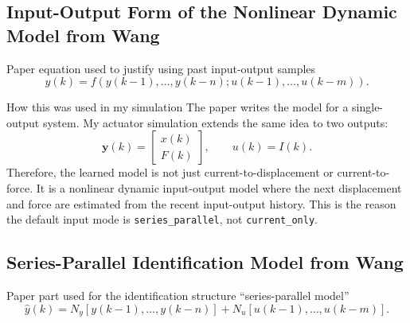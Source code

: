 \documentclass[11pt]{article}
\newcommand{\vect}[1]{\mathbf{#1}}
\begin{document}
\subsection{Input-Output Form of the Nonlinear Dynamic Model from Wang}
\begin{paperbox}{Paper equation used to justify using past input-output samples \cite{wang2017}}
\begin{equation}
 y(k)=f\left(y(k-1),\ldots,y(k-n);u(k-1),\ldots,u(k-m)\right).
\end{equation}
\end{paperbox}

\begin{implementationbox}{How this was used in my simulation}
The paper writes the model for a single-output system. My actuator simulation extends the same idea to two outputs:
\begin{equation}
\vect{y}(k)=\begin{bmatrix}x(k)\\F(k)\end{bmatrix},
\qquad u(k)=I(k).
\end{equation}
Therefore, the learned model is not just current-to-displacement or current-to-force. It is a nonlinear dynamic input-output model where the next displacement and force are estimated from the recent input-output history. This is the reason the default input mode is \texttt{series\_parallel}, not \texttt{current\_only}.
\end{implementationbox}

\subsection{Series-Parallel Identification Model from Wang}
\begin{paperbox}{Paper part used for the identification structure \cite{wang2017}}
\centering
``series-parallel model''
\begin{equation}
\hat{y}(k)=N_y\left[y(k-1),\ldots,y(k-n)\right]
+N_u\left[u(k-1),\ldots,u(k-m)\right].
\end{equation}
\end{paperbox}
\end{document}
